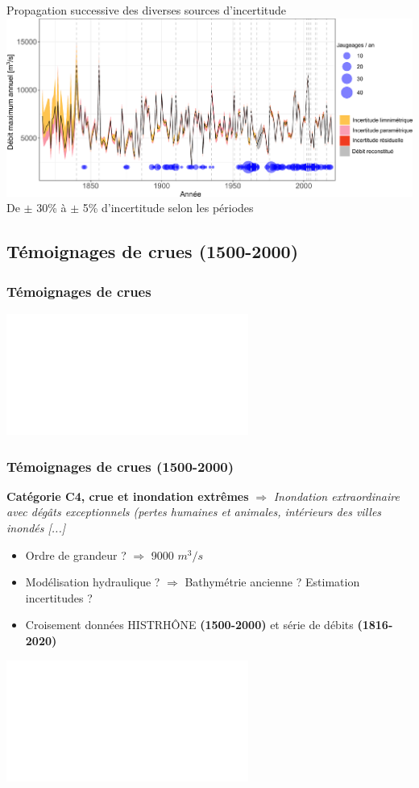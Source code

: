 \documentclass[compress,9pt]{beamer}
\begin{document}
\begin{frame}
\begin{minipage}{0.2\textwidth}
		\end{minipage}
		\hfill
		\begin{minipage}{0.78\textwidth}
			\centering
			Propagation successive des diverses sources d'incertitude\\
			\vspace{10pt}
			\includegraphics[width = \textwidth]{./Figures/uQ.pdf} 
			\centering
			\vspace{10pt}
			De $\pm$ 30\% à $\pm$ 5\% d'incertitude selon les périodes
		\end{minipage}
	\end{frame}	
		
	\subsection{Témoignages de crues (1500-2000)}
	\begin{frame}
		\frametitle{Témoignages de crues}
		\centering
		\includegraphics<1>[width = .6\textwidth]{./Figures/HistoFloods2.pdf} 		
	\end{frame}		
	
	\begin{frame}[t]
		\frametitle{Témoignages de crues (1500-2000)}
		\vfill
		\textbf{Catégorie C4, crue et inondation
extrêmes} $\Rightarrow$ \og \textit{Inondation extraordinaire avec dégâts exceptionnels (pertes humaines et animales, intérieurs des villes inondés [...]}\fg{}  
	\vfill
		\begin{itemize}
			\item<2->[$\vartriangleright$] Ordre de grandeur ? \citet{pichard_hydro-climatology_2017} $\Rightarrow$ 9000 $m^3/s$ 
			\item<3->[$\vartriangleright$] Modélisation hydraulique ? $\Rightarrow$ Bathymétrie ancienne ? Estimation incertitudes ?
			\item<4->[$\vartriangleright$] Croisement données HISTRHÔNE \textbf{(1500-2000)} et série de débits  \textbf{(1816-2020)}
		\end{itemize}
		\vfill
		\centering
		\includegraphics<5>[width = .75\textwidth]{./Figures/C4_SystematicPeriod-FR.pdf} 	
	\end{frame}		
		
\end{document}

